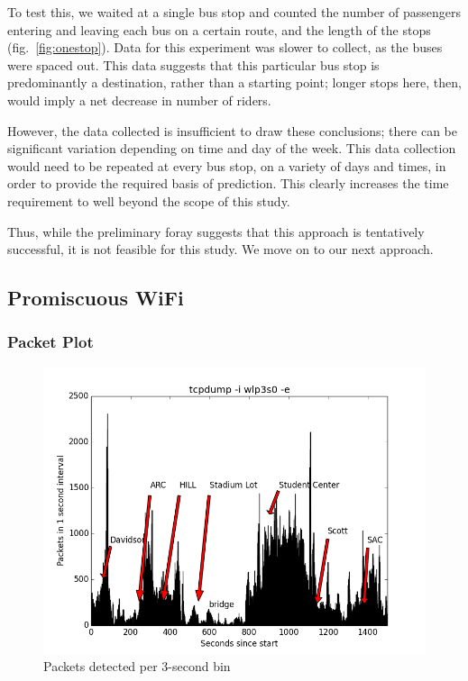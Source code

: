 To test this, we waited at a single bus stop and counted the number of passengers entering and leaving each bus on a certain route, and the length of the stops (fig.~\ref{fig:onestop}).
Data for this experiment was slower to collect, as the buses were spaced out.
This data suggests that this particular bus stop is predominantly a destination, rather than a starting point; longer stops here, then, would imply a net decrease in number of riders.
    
However, the data collected is insufficient to draw these conclusions; there can be significant variation depending on time and day of the week.
This data collection would need to be repeated at every bus stop, on a variety of days and times, in order to provide the required basis of prediction.
This clearly increases the time requirement to well beyond the scope of this study.
	
Thus, while the preliminary foray suggests that this approach is tentatively successful, it is not feasible for this study.
We move on to our next approach.

\subsection*{Promiscuous WiFi}
    
\subsubsection*{Packet Plot}
\begin{figure}[!t]
  \includegraphics[width=\textwidth]{packets}
  \caption{Packets detected per 3-second bin}
  \label{fig:buspackets}
\end{figure}

